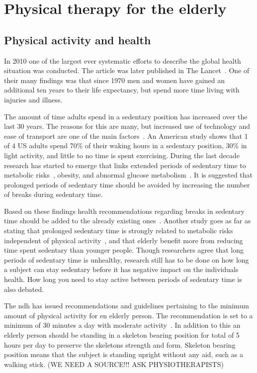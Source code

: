 \chapter{Physical therapy for the elderly}

\section{Physical activity and health}
In 2010 one of the largest ever systematic efforts to describe the global health situation was conducted. The article was later published in The Lancet~\cite{globalBurden}. One of their many findings was that since 1970 men and women have gained an additional ten years to their life expectancy, but spend more time living with injuries and illness. 

The amount of time adults spend in a sedentary position has increased over the last 30 years. The reasons for this are many, but increased use of technology and ease of transport are one of the main factors~\cite{sedentaryBehaviour}. An American study shows that 1 of 4 US adults spend 70\% of their waking hours in a sedentary position, 30\% in light activity, and little to no time is spent exercising. During the last decade research has started to emerge that links extended periods of sedentary time to metabolic risks~\cite{sedentaryTime}, obesity, and abnormal glucose metabolism~\cite{breaksSedentary}. It is suggested that prolonged periods of sedentary time should be avoided by increasing the number of breaks during sedentary time. 

Based on these findings health recommendations regarding breaks in sedentary time should be added to the already existing ones~\cite{breaksSedentary}. Another study goes as far as stating that prolonged sedentary time is strongly related to metabolic risks independent of physical activity~\cite{sedentaryActivity}, and that elderly benefit more from reducing time spent sedentary than younger people. Though researchers agree that long periods of sedentary time is unhealthy, research still has to be done on how long a subject can stay sedentary before it has negative impact on the individuals health. How long you need to stay active between periods of sedentary time is also debated.

The \gls{ndh} has issued recommendations and guidelines pertaining to the minimum amount of physical activity for en elderly person. The recommendation is set to a minimum of 30 minutes a day with moderate activity~\cite{helsedirektoratetFysiskAktivitet}. In addition to this an elderly person should be standing in a skeleton bearing position for total of 5 hours per day to preserve the skeletons strength and form. Skeleton bearing position means that the subject is standing upright without any aid, such as a walking stick. (WE NEED A SOURCE!!! ASK PHYSIOTHERAPISTS)

